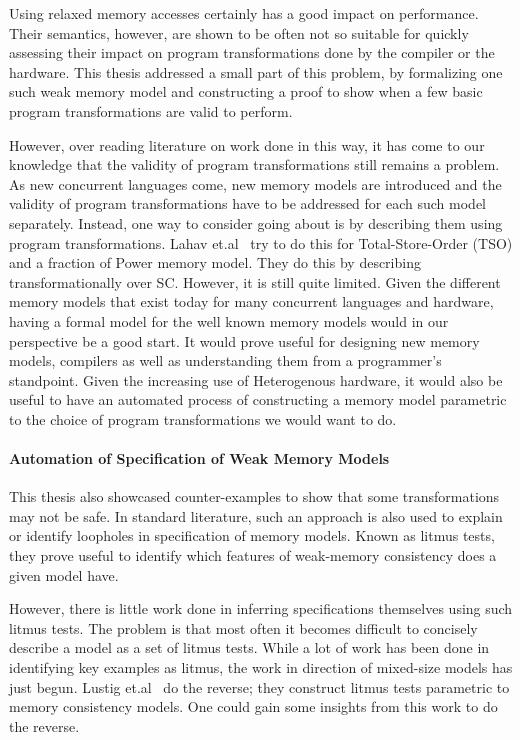         Using relaxed memory accesses certainly has a good impact on performance. 
        Their semantics, however, are shown to be often not so suitable for quickly assessing their impact on program transformations done by the compiler or the hardware. 
        This thesis addressed a small part of this problem, by formalizing one such weak memory model and constructing a proof to show when a few basic program transformations are valid to perform. 

        However, over reading literature on work done in this way, it has come to our knowledge that the validity of program transformations still remains a problem. 
        As new concurrent languages come, new memory models are introduced and the validity of program transformations have to be addressed for each such model separately. 
        Instead, one way to consider going about is by describing them using program transformations. 
        Lahav et.al~\cite{Lahav2} try to do this for Total-Store-Order (TSO) and a fraction of Power memory model. They do this by describing transformationally over SC. 
        However, it is still quite limited. 
        Given the different memory models that exist today for many concurrent languages and hardware, having a formal model for the well known memory models would in our perspective be a good start. 
        It would prove useful for designing new memory models, compilers as well as understanding them from a programmer's standpoint. 
        Given the increasing use of Heterogenous hardware, it would also be useful to have an automated process of constructing a memory model parametric to the choice of program transformations we would want to do.

    \paragraph{Automation of Specification of Weak Memory Models}

        This thesis also showcased counter-examples to show that some transformations may not be safe. 
        In standard literature, such an approach is also used to explain or identify loopholes in specification of memory models. 
        Known as litmus tests, they prove useful to identify which features of weak-memory consistency does a given model have. 

        However, there is little work done in inferring specifications themselves using such litmus tests. 
        The problem is that most often it becomes difficult to concisely describe a model as a set of litmus tests.
        While a lot of work has been done in identifying key examples as litmus, the work in direction of mixed-size models has just begun. 
        Lustig et.al~\cite{Lustig} do the reverse; they construct litmus tests parametric to memory consistency models. 
        One could gain some insights from this work to do the reverse. 
        